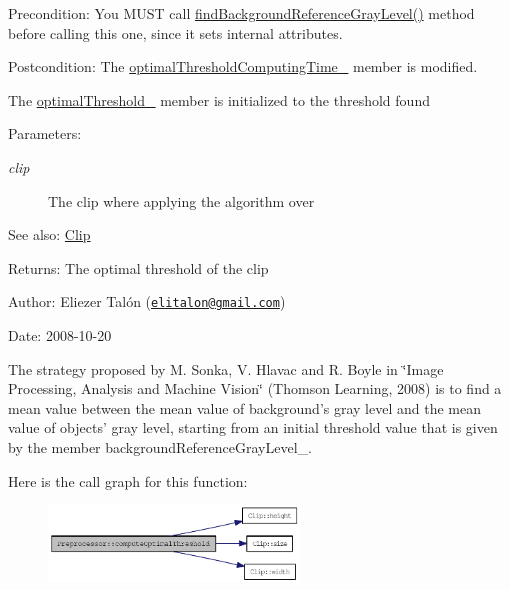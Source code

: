 \begin{Desc}
\item[Precondition:]You MUST call \hyperlink{class_preprocessor_a941f81382bd8e235e4dd12481342be4}{findBackgroundReferenceGrayLevel()} method before calling this one, since it sets internal attributes.\end{Desc}
\begin{Desc}
\item[Postcondition:]The \hyperlink{class_preprocessor_d52352691de7d8f0738b67e93a5898fc}{optimalThresholdComputingTime\_\-} member is modified. 

The \hyperlink{class_preprocessor_865b1e28dd9535b96f70727a550104fe}{optimalThreshold\_\-} member is initialized to the threshold found\end{Desc}
\begin{Desc}
\item[Parameters:]
\begin{description}
\item[{\em clip}]The clip where applying the algorithm over\end{description}
\end{Desc}
\begin{Desc}
\item[See also:]\hyperlink{class_clip}{Clip}\end{Desc}
\begin{Desc}
\item[Returns:]The optimal threshold of the clip\end{Desc}
\begin{Desc}
\item[Author:]Eliezer Talón (\href{mailto:elitalon@gmail.com}{\tt elitalon@gmail.com}) \end{Desc}
\begin{Desc}
\item[Date:]2008-10-20\end{Desc}
The strategy proposed by M. Sonka, V. Hlavac and R. Boyle in \char`\"{}Image Processing, Analysis and Machine Vision\char`\"{} (Thomson Learning, 2008) is to find a mean value between the mean value of background's gray level and the mean value of objects' gray level, starting from an initial threshold value that is given by the member backgroundReferenceGrayLevel\_\-. 

Here is the call graph for this function:\nopagebreak
\begin{figure}[H]
\begin{center}
\leavevmode
\includegraphics[width=189pt]{class_preprocessor_ac2f414d6f4f917419f33f6067eb8634_cgraph}
\end{center}
\end{figure}


